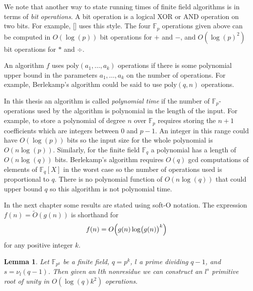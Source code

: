 \documentclass{article}
\newcounter{dummy} \numberwithin{dummy}{section}
\theoremstyle{plain}
\newtheorem{lem}[dummy]{Lemma}
\theoremstyle{definition}
\def\Fp {{ \mathbb{F} _ {p} }}
\def\Fq {{ \mathbb{F} _ {q} }}
\def\poly {{ \mathrm{poly} }}
\begin{document}
		We note that another way to state running times of finite field algorithms is in terms of \emph{bit operations}. A bit operation is a logical XOR or AND operation on two bits. For example, [] uses this style. The four $\Fp$ operations given above can be computed in $O(\log(p))$ bit operations for $+$ and $-$, and $O(\log(p)^2)$ bit operations for $*$ and $\div$. 
		
		An algorithm $f$ uses $\poly(a_1,\ldots,a_k)$ operations if there is some polynomial upper bound in the parameters $a_1,\ldots, a_k$ on the number of operations. For example, Berlekamp's algorithm could be said to use $\poly(q, n)$ operations. 

		In this thesis an algorithm is called \emph{polynomial time} if the number of $\Fp$-operations used by the algorithm is polynomial in the length of the input.  For example, to store a polynomial of degree $n$ over $\Fp$ requires storing the $n+1$ coefficients which are integers between $0$ and $p-1$. An integer in this range could have $O(\log(p))$ bits so the input size for the whole polynomial is $O(n\log(p))$. Similarly, for the finite field $\Fq$ a polynomial has a length of $O(n \log(q))$ bits. Berlekamp's algorithm requires $O(q)$ gcd computations of elements of $\Fq[X]$ in the worst case so the number of operations used is proportional to $q$. There is no polynomial function of $O(n \log(q))$ that could upper bound $q$ so this algorithm is not polynomial time. 
		
		In the next chapter some results are stated using soft-O notation. The expression $f(n)=\tilde{O}(g(n))$ is shorthand for 
		\[ f(n) = O \Bigl(g(n) \log \bigl(g(n) \bigr)^k \Bigr) \] 
		\noindent for any positive integer $k$. 
		
		
		\begin{lem}
		\label{LEM:primrootConstruction}
		    Let $\mathbb{F}_{p^k}$ be a finite field, $q=p^k$, $l$ a prime dividing $q-1$, and $s=\nu_l(q-1)$. Then given an $l$th nonresidue we can construct an $l^s$ primitive root of unity in $O(\log(q)k^2)$ operations. 
		\end{lem}
		
\end{document}
